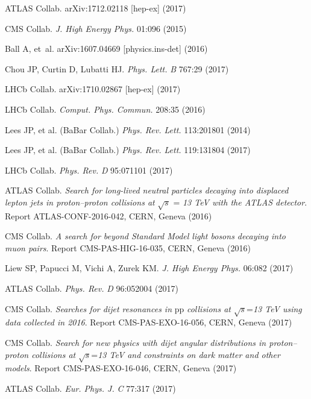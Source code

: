 \documentclass{ar-1col}
\begin{document}
\begin{thebibliography}{175}
{ATLAS Collab}. arXiv:1712.02118 [hep-ex] (2017)

{CMS Collab}. \textit{J. High Energy Phys.} 01:096 (2015)

Ball A, et~al. arXiv:1607.04669 [physics.ins-det] (2016)

Chou JP, Curtin D, Lubatti HJ. \textit{Phys. Lett.} \textit{B} 767:29 (2017)

{LHCb Collab}. arXiv:1710.02867 [hep-ex] (2017)

{LHCb Collab}. \textit{Comput. Phys. Commun.} 208:35 (2016)

{Lees JP, et al. (BaBar Collab}.) \textit{Phys. Rev. Lett.} 113:201801 (2014)

{Lees JP, et al. (BaBar Collab}.) \textit{Phys. Rev. Lett.} 119:131804 (2017)

{LHCb Collab}. \textit{Phys. Rev.} \textit{D} 95:071101 (2017)

ATLAS Collab. \textit{Search for long-lived neutral particles decaying into displaced lepton jets in proton--proton collisions at} $\sqrt{s}$ = \textit{13 TeV with the ATLAS detector}. Report ATLAS-CONF-2016-042, CERN, Geneva (2016)

CMS Collab. \textit{A search for beyond Standard Model light bosons decaying into muon pairs}.
Report CMS-PAS-HIG-16-035, CERN, Geneva (2016)

Liew SP, Papucci M, Vichi A, Zurek KM. \textit{J. High Energy Phys.} 06:082 (2017)

{ATLAS Collab}.  \textit{Phys. Rev.} \textit{D} 96:052004 (2017)

CMS Collab. \textit{Searches for dijet resonances in} pp\textit{ collisions at} $\sqrt{s}$=\textit{13 TeV using data collected in 2016}. Report CMS-PAS-EXO-16-056, CERN, Geneva (2017)

CMS Collab.\textit{ Search for new physics with dijet angular distributions in proton--proton collisions at} $\sqrt{s}$=\textit{13 TeV and constraints on dark matter and other models}. Report CMS-PAS-EXO-16-046, CERN, Geneva (2017)

{ATLAS Collab}.  \textit{Eur. Phys. J.} \textit{C} 77:317 (2017)


\end{thebibliography}
\end{document}
